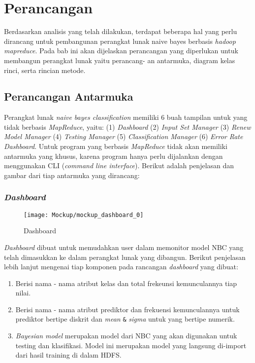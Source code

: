 \chapter{Perancangan}
Berdasarkan analisis yang telah dilakukan, terdapat beberapa hal yang perlu dirancang untuk pembangunan perangkat lunak naive bayes berbasis \textit{hadoop mapreduce}. Pada bab ini akan dijelaskan perancangan yang diperlukan untuk membangun perangkat lunak yaitu perancang-
an antarmuka, diagram kelas rinci, serta rincian metode.
			
\section{Perancangan Antarmuka}

Perangkat lunak \textit{naive bayes classification} memiliki 6 buah tampilan untuk yang tidak berbasis \textit{MapReduce}, yaitu: (1) \textit{Dashboard} (2) \textit{Input Set Manager} (3) \textit{Renew Model Manager} (4) \textit{Testing Manager} (5) \textit{Classification Manager} (6) \textit{Error Rate Dashboard}. Untuk program yang berbasis \textit{MapReduce} tidak akan memiliki antarmuka yang khusus, karena program hanya perlu dijalankan dengan menggunakan CLI (\textit{command line interface}). Berikut adalah penjelasan dan gambar dari tiap antarmuka yang dirancang:

\subsection{\textit{Dashboard}}

\begin{figure}[H]
	\centering
	\texttt{[image: Mockup/mockup\_dashboard\_0]}
	\caption[input-set-gui-1]{Dashboard}
	\label{fig:input-set-gui-1}
\end{figure}
\textit{Dashboard} dibuat untuk memudahkan user dalam memonitor model NBC yang telah dimasukkan ke dalam perangkat lunak yang dibangun. Berikut penjelasan lebih lanjut mengenai tiap komponen pada rancangan \textit{dashboard} yang dibuat:
\begin{enumerate}
	\item Berisi nama - nama atribut kelas dan total frekeunsi kemunculannya tiap nilai.
	\item Berisi nama - nama atribut prediktor dan frekuensi kemunculannya untuk prediktor bertipe diskrit dan \textit{mean} \verb|&| \textit{sigma} untuk yang bertipe numerik.
	\item \textit{Bayesian model} merupakan model dari NBC yang akan digunakan untuk testing dan klasifikasi. Model ini merupakan model yang langsung di-import dari hasil training di dalam HDFS.
\end{enumerate}

